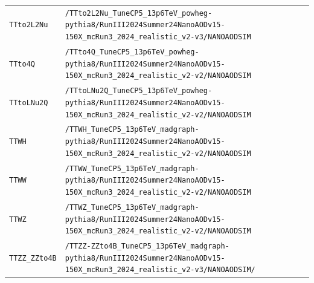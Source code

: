\begin{longtable}{@{}>{\RaggedRight\arraybackslash}p{} >{\RaggedRight\arraybackslash}p{}@{}}
\addlinespace[2pt]
\texttt{TTto2L2Nu} & \texttt{/\allowbreak{}TTto2L2Nu\_\allowbreak{}TuneCP5\_\allowbreak{}13p6TeV\_\allowbreak{}powheg-\allowbreak{}pythia8/\allowbreak{}RunIII2024Summer24NanoAODv15-\allowbreak{}150X\_\allowbreak{}mcRun3\_\allowbreak{}2024\_\allowbreak{}realistic\_\allowbreak{}v2-\allowbreak{}v3/\allowbreak{}NANOAODSIM} \\
\addlinespace[2pt]
\texttt{TTto4Q} & \texttt{/\allowbreak{}TTto4Q\_\allowbreak{}TuneCP5\_\allowbreak{}13p6TeV\_\allowbreak{}powheg-\allowbreak{}pythia8/\allowbreak{}RunIII2024Summer24NanoAODv15-\allowbreak{}150X\_\allowbreak{}mcRun3\_\allowbreak{}2024\_\allowbreak{}realistic\_\allowbreak{}v2-\allowbreak{}v2/\allowbreak{}NANOAODSIM} \\
\addlinespace[2pt]
\texttt{TTtoLNu2Q} & \texttt{/\allowbreak{}TTtoLNu2Q\_\allowbreak{}TuneCP5\_\allowbreak{}13p6TeV\_\allowbreak{}powheg-\allowbreak{}pythia8/\allowbreak{}RunIII2024Summer24NanoAODv15-\allowbreak{}150X\_\allowbreak{}mcRun3\_\allowbreak{}2024\_\allowbreak{}realistic\_\allowbreak{}v2-\allowbreak{}v2/\allowbreak{}NANOAODSIM} \\
\addlinespace[2pt]
\texttt{TTWH} & \texttt{/\allowbreak{}TTWH\_\allowbreak{}TuneCP5\_\allowbreak{}13p6TeV\_\allowbreak{}madgraph-\allowbreak{}pythia8/\allowbreak{}RunIII2024Summer24NanoAODv15-\allowbreak{}150X\_\allowbreak{}mcRun3\_\allowbreak{}2024\_\allowbreak{}realistic\_\allowbreak{}v2-\allowbreak{}v2/\allowbreak{}NANOAODSIM} \\
\addlinespace[2pt]
\texttt{TTWW} & \texttt{/\allowbreak{}TTWW\_\allowbreak{}TuneCP5\_\allowbreak{}13p6TeV\_\allowbreak{}madgraph-\allowbreak{}pythia8/\allowbreak{}RunIII2024Summer24NanoAODv15-\allowbreak{}150X\_\allowbreak{}mcRun3\_\allowbreak{}2024\_\allowbreak{}realistic\_\allowbreak{}v2-\allowbreak{}v2/\allowbreak{}NANOAODSIM} \\
\addlinespace[2pt]
\texttt{TTWZ} & \texttt{/\allowbreak{}TTWZ\_\allowbreak{}TuneCP5\_\allowbreak{}13p6TeV\_\allowbreak{}madgraph-\allowbreak{}pythia8/\allowbreak{}RunIII2024Summer24NanoAODv15-\allowbreak{}150X\_\allowbreak{}mcRun3\_\allowbreak{}2024\_\allowbreak{}realistic\_\allowbreak{}v2-\allowbreak{}v2/\allowbreak{}NANOAODSIM} \\
\addlinespace[2pt]
\texttt{TTZZ\_\allowbreak{}ZZto4B} & \texttt{/\allowbreak{}TTZZ-\allowbreak{}ZZto4B\_\allowbreak{}TuneCP5\_\allowbreak{}13p6TeV\_\allowbreak{}madgraph-\allowbreak{}pythia8/\allowbreak{}RunIII2024Summer24NanoAODv15-\allowbreak{}150X\_\allowbreak{}mcRun3\_\allowbreak{}2024\_\allowbreak{}realistic\_\allowbreak{}v2-\allowbreak{}v3/\allowbreak{}NANOAODSIM/\allowbreak{}} \\

\end{longtable}

